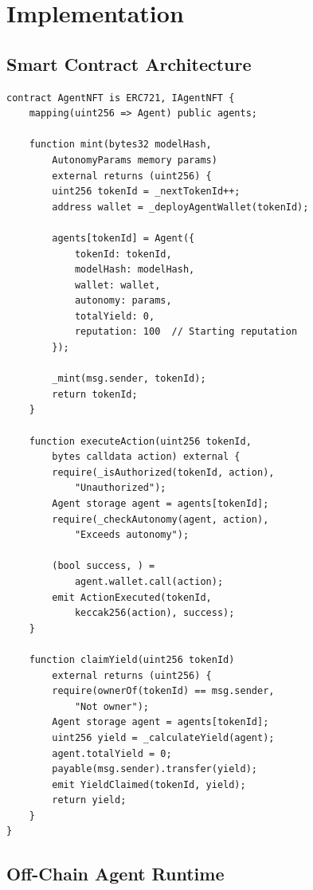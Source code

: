 \section{Implementation}


\subsection{Smart Contract Architecture}

\begin{lstlisting}[language=Solidity,caption=AgentNFT Contract (Simplified)]
contract AgentNFT is ERC721, IAgentNFT {
    mapping(uint256 => Agent) public agents;

    function mint(bytes32 modelHash,
        AutonomyParams memory params)
        external returns (uint256) {
        uint256 tokenId = _nextTokenId++;
        address wallet = _deployAgentWallet(tokenId);

        agents[tokenId] = Agent({
            tokenId: tokenId,
            modelHash: modelHash,
            wallet: wallet,
            autonomy: params,
            totalYield: 0,
            reputation: 100  // Starting reputation
        });

        _mint(msg.sender, tokenId);
        return tokenId;
    }

    function executeAction(uint256 tokenId,
        bytes calldata action) external {
        require(_isAuthorized(tokenId, action),
            "Unauthorized");
        Agent storage agent = agents[tokenId];
        require(_checkAutonomy(agent, action),
            "Exceeds autonomy");

        (bool success, ) =
            agent.wallet.call(action);
        emit ActionExecuted(tokenId,
            keccak256(action), success);
    }

    function claimYield(uint256 tokenId)
        external returns (uint256) {
        require(ownerOf(tokenId) == msg.sender,
            "Not owner");
        Agent storage agent = agents[tokenId];
        uint256 yield = _calculateYield(agent);
        agent.totalYield = 0;
        payable(msg.sender).transfer(yield);
        emit YieldClaimed(tokenId, yield);
        return yield;
    }
}
\end{lstlisting}

\subsection{Off-Chain Agent Runtime}

